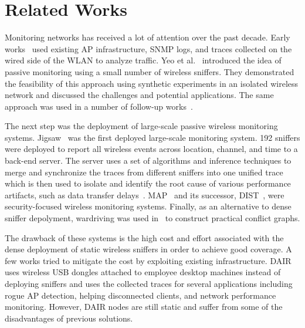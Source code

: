 \section{Related Works}
\label{sec:related}

Monitoring \wifi{} networks has received a lot of attention over the past
decade. Early
works~\cite{balachandran:sigmetrics2002,henderson:mobicom2004,meng:mobicom2004,schwab:infocom2004,chen:mccr2010}
used existing AP infrastructure, SNMP logs, and traces collected on the wired
side of the WLAN to analyze \wifi{} traffic. Yeo et
al.~\cite{yeo:wise2004,yeo:witmemo2005} introduced the idea of passive
monitoring using a small number of wireless sniffers. They demonstrated the
feasibility of this approach using synthetic experiments in an isolated
wireless network and discussed the challenges and potential applications. The
same approach was used in a number of
follow-up works~\cite{jardosh:wind2005,jardosh:imc2005}.

The next step was the deployment of large-scale passive wireless monitoring
systems. Jigsaw~\cite{cheng:sigcomm2006} was the first deployed large-scale
monitoring system. 192 sniffers were deployed to report all wireless events
across location, channel, and time to a back-end server. The server uses a set
of algorithms and inference techniques to merge and synchronize the traces from
different sniffers into one unified trace which is then used to isolate and
identify the root cause of various performance artifacts, such as data transfer
delays~\cite{cheng:sigcomm2007}.  MAP~\cite{sheng:wicom2008} and its successor,
DIST~\cite{tan:tmc2014}, were security-focused wireless monitoring systems.
Finally, as an alternative to dense sniffer depolyment, wardriving was used
in~\cite{zhou:sigmetrics2013} to construct practical conflict graphs.

The drawback of these systems is the high cost and effort associated with the
dense deployment of static wireless sniffers in order to achieve good
coverage. A few works tried to mitigate the cost by exploiting existing
infrastructure.
DAIR~\cite{bahl:mobisys2006,chan:nsdi2006} uses wireless USB dongles attached
to employee desktop machines instead of deploying
sniffers and uses the collected traces for several applications including
rogue AP detection, helping disconnected
clients, and network performance monitoring. However, DAIR nodes are still
static and suffer from some of the disadvantages of previous solutions.

